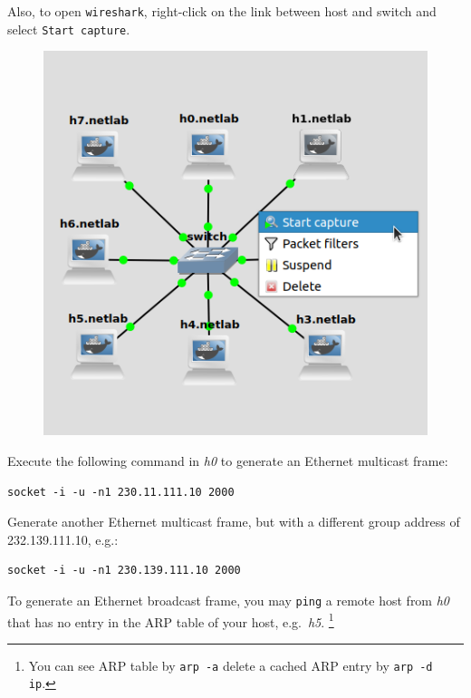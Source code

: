 \documentclass{../UTNetLab}
\begin{document}
Also, to open \lstinline{wireshark}, right-click on the link between host and switch and select \texttt{Start capture}.
\begin{figure}[H]
    \centering
    \includegraphics[scale=1.8]{img/capture}
\end{figure}

Execute the following command in \textit{h0} to generate an Ethernet multicast frame:

\begin{lstlisting}[emph={your-host, remote-host}]
socket -i -u -n1 230.11.111.10 2000
    \end{lstlisting}

Generate another Ethernet multicast frame, but with a different group address of {232.139.111.10}, e.g.:

\begin{lstlisting}[emph={your-host, remote-host}]
socket -i -u -n1 230.139.111.10 2000
    \end{lstlisting}


To generate an Ethernet broadcast frame, you may \lstinline{ping} a remote host from \textit{h0} that has no entry in the ARP table of your host, e.g.\ \textit{h5}.
\footnote{You can see ARP table by \lstinline{arp -a} delete a cached ARP entry by \lstinline[emph={ip}]{arp -d ip}.}
\end{document}
